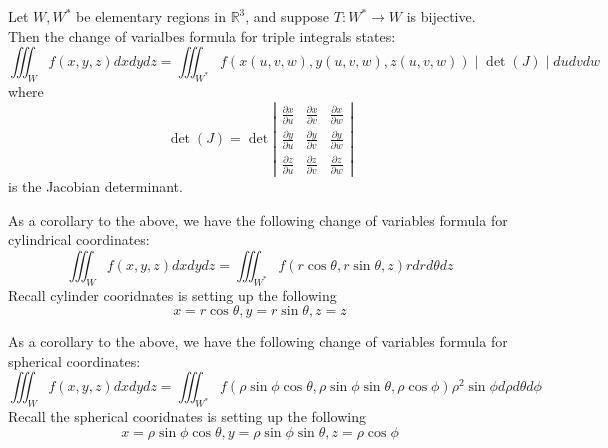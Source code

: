 \documentclass[openany]{book}
\newcommand{\R}{\mathbb{R}}
\begin{document}
\begin{prop}
    Let $W,W^*$ be elementary regions in $\R^3$, and suppose $T:W^*\to W$ is bijective. Then the change of varialbes formula for triple integrals states:
    \begin{equation*}
        \iiint_Wf(x,y,z)dxdydz=\iiint_{W^*}f(x(u,v,w), y(u,v,w), z(u,v,w))\mid\det(J)\mid dudvdw
    \end{equation*}
    where 
    \begin{equation*}
        \det(J)=\det\left|\begin{matrix}
            \frac{\partial x}{\partial u}&\frac{\partial x}{\partial v}&\frac{\partial x}{\partial w}\\
            \frac{\partial y}{\partial u}&\frac{\partial y}{\partial v}&\frac{\partial y}{\partial w}\\
            \frac{\partial z}{\partial u}&\frac{\partial z}{\partial v}&\frac{\partial z}{\partial w}
        \end{matrix}\right|
    \end{equation*}
    is the Jacobian determinant.
\end{prop}


\begin{prop}
    As a corollary to the above, we have the following change of variables formula for cylindrical coordinates:
    \begin{equation*}
        \iiint_Wf(x,y,z)dxdydz=\iiint_{W^*}f(r\cos\theta, r\sin\theta, z)rdrd\theta dz
    \end{equation*}
    Recall cylinder cooridnates is setting up the following 
    \begin{equation*}
        x=r\cos\theta, y=r\sin\theta, z=z
    \end{equation*}
\end{prop}

\begin{prop}
    As a corollary to the above, we have the following change of variables formula for spherical coordinates:
    \begin{equation*}
        \iiint_Wf(x,y,z)dxdydz=\iiint_{W^*}f(\rho\sin\phi\cos\theta, \rho\sin\phi\sin\theta, \rho\cos\phi)\rho^2\sin\phi d\rho d\theta d\phi
    \end{equation*}
    Recall the spherical cooridnates is setting up the following 
    \begin{equation*}
        x=\rho\sin\phi\cos\theta, y=\rho\sin\phi\sin\theta, z=\rho\cos\phi
    \end{equation*}


\end{prop}
\end{document}
